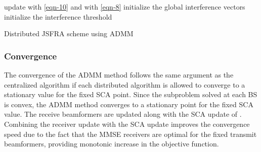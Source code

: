 {\allowdisplaybreaks 
	\begin{algorithm}
		\SetAlgoLined
		\DontPrintSemicolon
		\BlankLine
		update  with \eqref{eqn-10} and  with \eqref{eqn-8} \;
		initialize the global interference vectors  \;
		initialize the interference threshold  \;
		\caption{Distributed \ac{JSFRA} scheme using \ac{ADMM}}
		\label{algo-3}
	\end{algorithm}
}
\subsubsection*{Convergence}
The convergence of the \ac{ADMM} method follows the same argument as the centralized algorithm if each distributed algorithm is allowed to converge to a stationary value for the fixed \ac{SCA} point. Since the subproblem solved at each \ac{BS} is convex, the \ac{ADMM} method converges to a stationary point \cite{boyd2011distributed} for the fixed \ac{SCA} value. The receive beamformers are updated along with the \ac{SCA} update of . Combining the receiver update with the \ac{SCA} update improves the convergence speed due to the fact that the \ac{MMSE} receivers are optimal for the fixed transmit beamformers, providing monotonic increase in the objective function.
